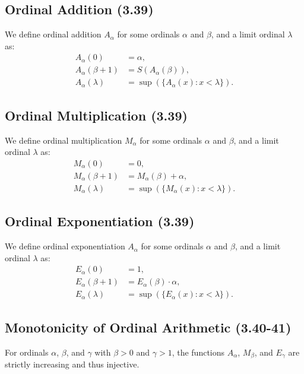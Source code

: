 \subsection{Ordinal Addition (3.39)} \label{3.39a}

We define ordinal addition $A_\alpha$ for some ordinals
$\alpha$ and $\beta$, and a limit ordinal $\lambda$ as: \begin{align*}
    A_\alpha(0) &= \alpha, \\
    A_\alpha(\beta + 1) &= S(A_\alpha(\beta)), \\
    A_\alpha(\lambda) &= \sup(\{A_\alpha(x) : x < \lambda\}).
\end{align*}

\subsection{Ordinal Multiplication (3.39)} \label{3.39m}

We define ordinal multiplication $M_\alpha$ for some ordinals
$\alpha$ and $\beta$, and a limit ordinal $\lambda$ as: \begin{align*}
    M_\alpha(0) &= 0, \\
    M_\alpha(\beta + 1) &= M_\alpha(\beta) + \alpha, \\
    M_\alpha(\lambda) &= \sup(\{M_\alpha(x) : x < \lambda\}).
\end{align*}

\subsection{Ordinal Exponentiation (3.39)} \label{3.39e}

We define ordinal exponentiation $A_\alpha$ for some ordinals
$\alpha$ and $\beta$, and a limit ordinal $\lambda$ as: \begin{align*}
    E_\alpha(0) &= 1, \\
    E_\alpha(\beta + 1) &= E_\alpha(\beta) \cdot \alpha, \\
    E_\alpha(\lambda) &= \sup(\{E_\alpha(x) : x < \lambda\}).
\end{align*}

\subsection{Monotonicity of Ordinal Arithmetic (3.40-41)} \label{3.40} \label{3.41}

For ordinals $\alpha$, $\beta$, and $\gamma$ with $\beta > 0$ and $\gamma > 1$,
the functions $A_\alpha$, $M_\beta$, and $E_\gamma$ are strictly increasing 
and thus injective.

